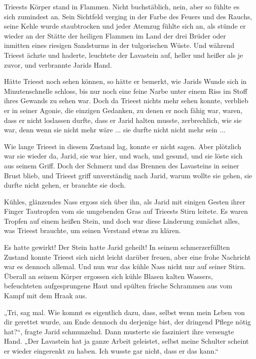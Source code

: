 Trieests Körper stand in Flammen. Nicht buchstäblich, nein, aber so fühlte es sich zumindest an. Sein Sichtfeld verging in der Farbe des Feuers und des Rauchs, seine Kehle wurde staubtrocken und jeder Atemzug fühlte sich an, als stünde er wieder an der Stätte der heiligen Flammen im Land der drei Brüder oder inmitten eines riesigen Sandsturms in der tulgorischen Wüste. Und während Trieest ächzte und haderte, leuchtete der Lavastein auf, heller und heißer als je zuvor, und verbrannte Jarids Hand.

Hätte Trieest noch sehen können, so hätte er bemerkt, wie Jarids Wunde sich in Minutenschnelle schloss, bis nur noch eine feine Narbe unter einem Riss im Stoff ihres Gewands zu sehen war. Doch da Trieest nichts mehr sehen konnte, verblieb er in seiner Agonie, die einzigen Gedanken, zu denen er noch fähig war, waren, dass er nicht loslassen durfte, dass er Jarid halten musste, zerbrechlich, wie sie war, denn wenn sie nicht mehr wäre ... sie durfte nicht nicht mehr sein ...

Wie lange Trieest in diesem Zustand lag, konnte er nicht sagen. Aber plötzlich war sie wieder da, Jarid, sie war hier, und wach, und gesund, und sie löste sich aus seinem Griff. Doch der Schmerz und das Brennen des Lavasteins in seiner Brust blieb, und Trieest griff unverständig nach Jarid, warum wollte sie gehen, sie durfte nicht gehen, er brauchte sie doch.

Kühles, glänzendes Nass ergoss sich über ihn, als Jarid mit einigen Gesten ihrer Finger Tautropfen vom sie umgebenden Gras auf Trieests Stirn leitete. Es waren Tropfen auf einem heißen Stein, und doch war diese Linderung zunächst alles, was Trieest brauchte, um seinen Verstand etwas zu klären.

Es hatte gewirkt! Der Stein hatte Jarid geheilt! In seinem schmerzerfüllten Zustand konnte Trieest sich nicht leicht darüber freuen, aber eine frohe Nachricht war es dennoch allemal. Und nun war das kühle Nass nicht nur auf seiner Stirn. Überall an seinem Körper ergossen sich kühle Blasen kalten Wassers, befeuchteten aufgesprungene Haut und spülten frische Schrammen aus vom Kampf mit dem Hraak aus.

„Tri, sag mal. Wie kommt es eigentlich dazu, dass, selbst wenn mein Leben von dir gerettet wurde, am Ende dennoch du derjenige bist, der dringend Pflege nötig hat?“, fragte Jarid schmunzelnd. Dann musterte sie fasziniert ihre versengte Hand. „Der Lavastein hat ja ganze Arbeit geleistet, selbst meine Schulter scheint er wieder eingerenkt zu haben. Ich wusste gar nicht, dass er das kann.“

